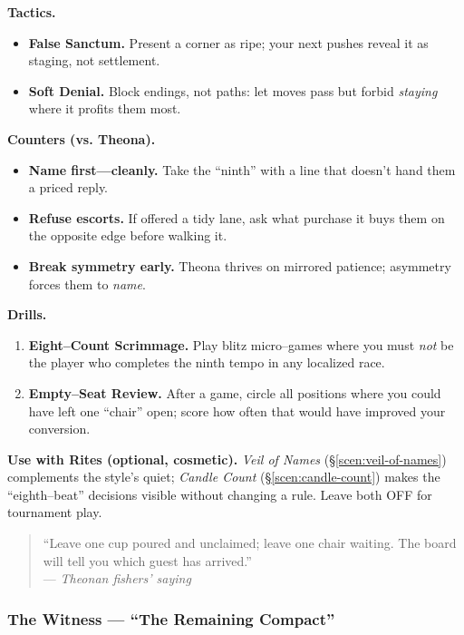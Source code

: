 \documentclass[11pt]{article}
\begin{document}
\begin{itemize}
\medskip
\noindent\textbf{Tactics.}
\begin{itemize}\setlength\itemsep{0.25em}
  \item \textbf{False Sanctum.} Present a corner as ripe; your next pushes reveal it as staging, not settlement.
  \item \textbf{Soft Denial.} Block endings, not paths: let moves pass but forbid \emph{staying} where it profits them most.
\end{itemize}

\medskip
\noindent\textbf{Counters (vs. Theona).}
\begin{itemize}\setlength\itemsep{0.25em}
  \item \textbf{Name first—cleanly.} Take the “ninth” with a line that doesn’t hand them a priced reply.
  \item \textbf{Refuse escorts.} If offered a tidy lane, ask what purchase it buys them on the opposite edge before walking it.
  \item \textbf{Break symmetry early.} Theona thrives on mirrored patience; asymmetry forces them to \emph{name}.
\end{itemize}

\medskip
\noindent\textbf{Drills.}
\begin{enumerate}\setlength\itemsep{0.25em}
  \item \textbf{Eight–Count Scrimmage.} Play blitz micro–games where you must \emph{not} be the player who completes the ninth tempo in any localized race.
  \item \textbf{Empty–Seat Review.} After a game, circle all positions where you could have left one “chair” open; score how often that would have improved your conversion.
\end{enumerate}

\medskip
\noindent\textbf{Use with Rites (optional, cosmetic).} \emph{Veil of Names} (\S\ref{scen:veil-of-names}) complements the style’s quiet; \emph{Candle Count} (\S\ref{scen:candle-count}) makes the “eighth–beat” decisions visible without changing a rule. Leave both \textsc{OFF} for tournament play.

\medskip
\begin{quote}\small
“Leave one cup poured and unclaimed; leave one chair waiting. The board will tell you which guest has arrived.”\\
\hfill — \textit{Theonan fishers’ saying}
\end{quote}

\subsubsection{The Witness — “The Remaining Compact”}
\label{school:witness}


\end{itemize}
\end{document}
